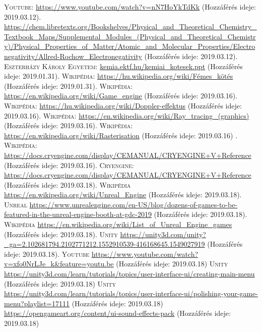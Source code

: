 \documentclass[colorlinks]{thesis-ekf}
\theoremstyle{definition}
\theoremstyle{remark}
\begin{document}
\begin{thebibliography}{1}
	 \textsc{Youtube}: \url{https://www.youtube.com/watch?v=nN7HoYkTdKk} (Hozzáférés ideje: 2019.03.12).
	 \url{https://chem.libretexts.org/Bookshelves/Physical_and_Theoretical_Chemistry_Textbook_Maps/Supplemental_Modules_(Physical_and_Theoretical_Chemistry)/Physical_Properties_of_Matter/Atomic_and_Molecular_Properties/Electronegativity/Allred-Rochow_Electronegativity} (Hozzáférés ideje: 2019.03.12).
	 \textsc{Eszterházy Károly Egyetem}: \url{kemia.ektf.hu/kemiai_kotesek.ppt} (Hozzáférés ideje: 2019.01.31).
	 \textsc{Wikipédia}: \url{https://hu.wikipedia.org/wiki/Fémes_kötés} (Hozzáférés ideje: 2019.01.31).
	 \textsc{Wikipédia}: \url{https://en.wikipedia.org/wiki/Game_engine} (Hozzáférés ideje: 2019.03.16).
	 \textsc{Wikipédia}: \url{https://hu.wikipedia.org/wiki/Doppler-effektus} (Hozzáférés ideje: 2019.03.16).
	 \textsc{Wikipédia}: \url{https://en.wikipedia.org/wiki/Ray_tracing_(graphics)} (Hozzáférés ideje: 2019.03.16).
	 \textsc{Wikipédia}: \url{https://en.wikipedia.org/wiki/Rasterisation} (Hozzáférés ideje: 2019.03.16)
	. \textsc{Wikipédia}: \url{https://docs.cryengine.com/display/CEMANUAL/CRYENGINE+V+Reference} (Hozzáférés ideje: 2019.03.16).
	 \textsc{Cryengine}: \url{https://docs.cryengine.com/display/CEMANUAL/CRYENGINE+V+Reference} (Hozzáférés ideje: 2019.03.18).
	 \textsc{Wikipédia} \url{https://en.wikipedia.org/wiki/Unreal_Engine} (Hozzáférés ideje: 2019.03.18).
	 \textsc{Unreal} \url{https://www.unrealengine.com/en-US/blog/dozens-of-games-to-be-featured-in-the-unreal-engine-booth-at-gdc-2019} (Hozzáférés ideje: 2019.03.18).
	 \textsc{Wikipédia} \url{https://en.wikipedia.org/wiki/List_of_Unreal_Engine_games} (Hozzáférés ideje: 2019.03.18).
	 \textsc{Unity} \url{https://unity3d.com/unity?_ga=2.102681794.2102771212.1552910539-416168645.1549027919} (Hozzáférés ideje: 2019.03.18).
	\textsc{Youtube} \url{https://www.youtube.com/watch?v=xfo0NrLJe_k&feature=youtu.be} (Hozzáférés ideje: 2019.03.18)
	\textsc{Unity} \url{https://unity3d.com/learn/tutorials/topics/user-interface-ui/creating-main-menu} (Hozzáférés ideje: 2019.03.18)
	\textsc{Unity} \url{https://unity3d.com/learn/tutorials/topics/user-interface-ui/polishing-your-game-menu?playlist=17111} (Hozzáférés ideje: 2019.03.18)
	 \url{https://opengameart.org/content/ui-sound-effects-pack} (Hozzáférés ideje: 2019.03.18)

\end{thebibliography}
\end{document}
